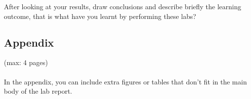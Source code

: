 \documentclass[a4paper,11pt]{article}
\begin{document}
After looking at your results, draw conclusions and describe briefly the learning outcome, that is what have you learnt by performing these labs?  

\newpage
\begin{appendix}

\section{Appendix}
(max: 4 pages)
\\\\
In the appendix, you can include extra figures or tables that don't fit in the main body of the lab report. 

\end{appendix}
\end{document}

